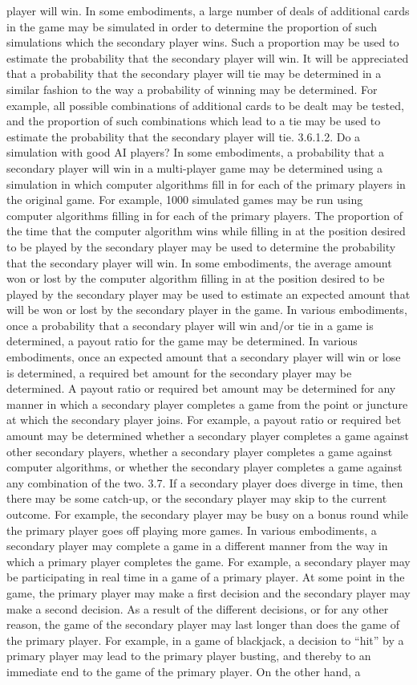 \documentclass[11pt,a4paper]{article}
\begin{document}
player will win. In some embodiments, a large number of deals of additional cards in the game may be simulated in order to determine the proportion of such simulations which the secondary player wins. Such a proportion may be used to estimate the probability that the secondary player will win. It will be appreciated that a probability that the secondary player will tie may be determined in a similar fashion to the way a probability of winning may be determined. For example, all possible combinations of additional cards to be dealt may be tested, and the proportion of such combinations which lead to a tie may be used to estimate the probability that the secondary player will tie. 3.6.1.2. Do a simulation with good AI players? In some embodiments, a probability that a secondary player will win in a multi-player game may be determined using a simulation in which computer algorithms fill in for each of the primary players in the original game. For example, 1000 simulated games may be run using computer algorithms filling in for each of the primary players. The proportion of the time that the computer algorithm wins while filling in at the position desired to be played by the secondary player may be used to determine the probability that the secondary player will win. In some embodiments, the average amount won or lost by the computer algorithm filling in at the position desired to be played by the secondary player may be used to estimate an expected amount that will be won or lost by the secondary player in the game. In various embodiments, once a probability that a secondary player will win and/or tie in a game is determined, a payout ratio for the game may be determined. In various embodiments, once an expected amount that a secondary player will win or lose is determined, a required bet amount for the secondary player may be determined. A payout ratio or required bet amount may be determined for any manner in which a secondary player completes a game from the point or juncture at which the secondary player joins. For example, a payout ratio or required bet amount may be determined whether a secondary player completes a game against other secondary players, whether a secondary player completes a game against computer algorithms, or whether the secondary player completes a game against any combination of the two. 3.7. If a secondary player does diverge in time, then there may be some catch-up, or the secondary player may skip to the current outcome. For example, the secondary player may be busy on a bonus round while the primary player goes off playing more games. In various embodiments, a secondary player may complete a game in a different manner from the way in which a primary player completes the game. For example, a secondary player may be participating in real time in a game of a primary player. At some point in the game, the primary player may make a first decision and the secondary player may make a second decision. As a result of the different decisions, or for any other reason, the game of the secondary player may last longer than does the game of the primary player. For example, in a game of blackjack, a decision to “hit” by a primary player may lead to the primary player busting, and thereby to an immediate end to the game of the primary player. On the other hand, a 
\end{document}
